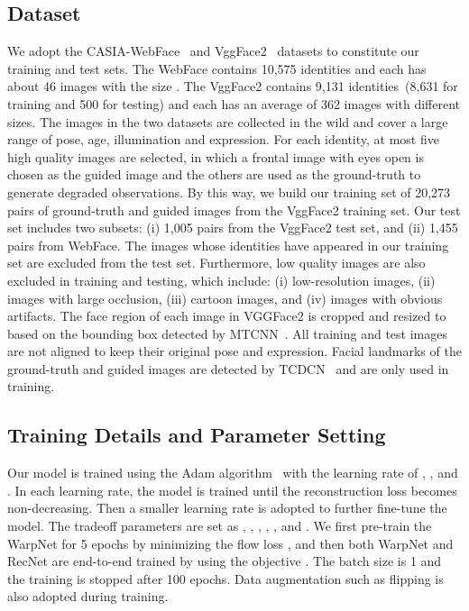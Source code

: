 \documentclass[runningheads]{llncs}
\begin{document}
\subsection{Dataset}
We adopt the CASIA-WebFace~\cite{Webface} and VggFace2~\cite{Vggface2} datasets to constitute our training and test sets.
The WebFace contains 10,575 identities and each has about 46 images with the size .
The VggFace2 contains 9,131 identities~(8,631 for training and 500 for testing) and each has an average of 362 images with different sizes.
The images in the two datasets are collected in the wild and cover a large range of pose, age, illumination and expression.
For each identity, at most five high quality images are selected, in which a frontal image with eyes open is chosen as the guided image and the others are used as the ground-truth to generate degraded observations.
By this way, we build our training set of 20,273 pairs of ground-truth and guided images from the VggFace2 training set.
Our test set includes two subsets: (i) 1,005 pairs from the VggFace2 test set, and (ii) 1,455 pairs from WebFace.
The images whose identities have appeared in our training set are excluded from the test set.
Furthermore, low quality images are also excluded in training and testing, which include: (i) low-resolution images, (ii) images with large occlusion, (iii) cartoon images, and (iv) images with obvious artifacts.
The face region of each image in VGGFace2 is cropped and resized to  based on the bounding box detected by MTCNN~\cite{MTCNN}.
All training and test images are not aligned to keep their original pose and expression.
Facial landmarks of the ground-truth and guided images are detected by TCDCN~\cite{TCDCN} and are only used in training.

\subsection{Training Details and Parameter Setting}
Our model is trained using the Adam algorithm~\cite{kingma2014adam} with the learning rate of , ,   and .
In each learning rate, the model is trained until the reconstruction loss becomes non-decreasing.
Then a smaller learning rate is adopted to further fine-tune the model.
The tradeoff parameters are set as , , , , , and .
We first pre-train the WarpNet for 5 epochs by minimizing the flow loss , and then both WarpNet and RecNet are end-to-end trained by using the objective .
The batch size is 1 and the training is stopped after 100 epochs.
Data augmentation such as flipping is also adopted during training.
\end{document}
